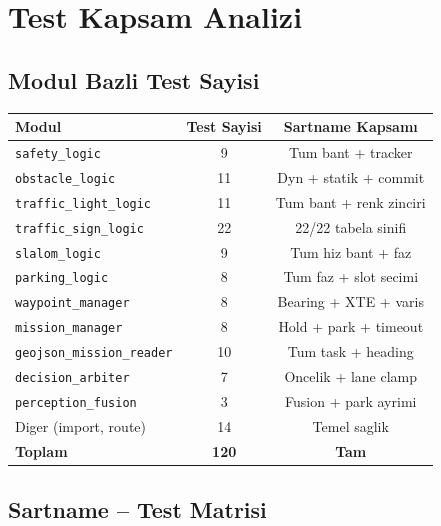 \documentclass[a4paper,12pt]{article}
\begin{document}
\section{Test Kapsam Analizi}

\subsection{Modul Bazli Test Sayisi}

\begin{center}
\begin{tabular}{lcc}
  \toprule
  Modul                               & Test Sayisi & Sartname Kapsamı\\
  \midrule
  \texttt{safety\_logic}              & 9           & Tum bant + tracker\\
  \texttt{obstacle\_logic}            & 11          & Dyn + statik + commit\\
  \texttt{traffic\_light\_logic}      & 11          & Tum bant + renk zinciri\\
  \texttt{traffic\_sign\_logic}       & 22          & 22/22 tabela sinifi\\
  \texttt{slalom\_logic}              & 9           & Tum hiz bant + faz\\
  \texttt{parking\_logic}             & 8           & Tum faz + slot secimi\\
  \texttt{waypoint\_manager}          & 8           & Bearing + XTE + varis\\
  \texttt{mission\_manager}           & 8           & Hold + park + timeout\\
  \texttt{geojson\_mission\_reader}   & 10          & Tum task + heading\\
  \texttt{decision\_arbiter}          & 7           & Oncelik + lane clamp\\
  \texttt{perception\_fusion}         & 3           & Fusion + park ayrimi\\
  Diger (import, route)               & 14          & Temel saglik\\
  \midrule
  \textbf{Toplam}                     & \textbf{120}& \textbf{Tam}\\
  \bottomrule
\end{tabular}
\end{center}

\subsection{Sartname -- Test Matrisi}
\end{document}
